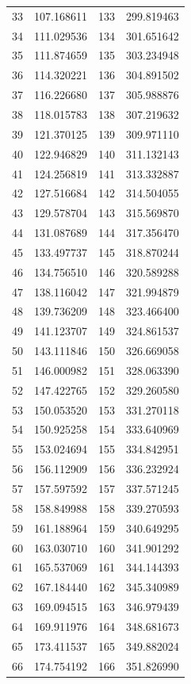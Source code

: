 \documentclass[11pt,a4paper]{article}
\begin{document}
\begin{longtable}{@{}rlrl@{}}
33 & 107.168611 & 133 & 299.819463 \\
34 & 111.029536 & 134 & 301.651642 \\
35 & 111.874659 & 135 & 303.234948 \\
36 & 114.320221 & 136 & 304.891502 \\
37 & 116.226680 & 137 & 305.988876 \\
38 & 118.015783 & 138 & 307.219632 \\
39 & 121.370125 & 139 & 309.971110 \\
40 & 122.946829 & 140 & 311.132143 \\
41 & 124.256819 & 141 & 313.332887 \\
42 & 127.516684 & 142 & 314.504055 \\
43 & 129.578704 & 143 & 315.569870 \\
44 & 131.087689 & 144 & 317.356470 \\
45 & 133.497737 & 145 & 318.870244 \\
46 & 134.756510 & 146 & 320.589288 \\
47 & 138.116042 & 147 & 321.994879 \\
48 & 139.736209 & 148 & 323.466400 \\
49 & 141.123707 & 149 & 324.861537 \\
50 & 143.111846 & 150 & 326.669058 \\
51 & 146.000982 & 151 & 328.063390 \\
52 & 147.422765 & 152 & 329.260580 \\
53 & 150.053520 & 153 & 331.270118 \\
54 & 150.925258 & 154 & 333.640969 \\
55 & 153.024694 & 155 & 334.842951 \\
56 & 156.112909 & 156 & 336.232924 \\
57 & 157.597592 & 157 & 337.571245 \\
58 & 158.849988 & 158 & 339.270593 \\
59 & 161.188964 & 159 & 340.649295 \\
60 & 163.030710 & 160 & 341.901292 \\
61 & 165.537069 & 161 & 344.144393 \\
62 & 167.184440 & 162 & 345.340989 \\
63 & 169.094515 & 163 & 346.979439 \\
64 & 169.911976 & 164 & 348.681673 \\
65 & 173.411537 & 165 & 349.882024 \\
66 & 174.754192 & 166 & 351.826990 \\

\end{longtable}
\end{document}
